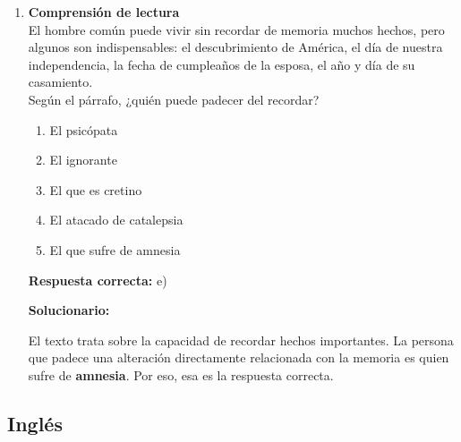 \begin{enumerate}[resume]
	\vspace{6mm}
	
	\item \textbf{Comprensión de lectura}\\
	El hombre común puede vivir sin recordar de memoria muchos hechos, pero algunos son indispensables: el descubrimiento de América, el día de nuestra independencia, la fecha de cumpleaños de la esposa, el año y día de su casamiento.\\
	Según el párrafo, ¿quién puede padecer del recordar?
	\begin{enumerate}[label=\alph*)]
		\item El psicópata
		\item El ignorante
		\item El que es cretino
		\item El atacado de catalepsia
		\item El que sufre de amnesia
	\end{enumerate}
	\textbf{Respuesta correcta:} e)
	
	\vspace{2mm}
	\textbf{Solucionario:}
	
	El texto trata sobre la capacidad de recordar hechos importantes. La persona que padece una alteración directamente relacionada con la memoria es quien sufre de \textbf{amnesia}. Por eso, esa es la respuesta correcta.
	
	\vspace{6mm}
	
\end{enumerate}

\subsection*{Inglés}


